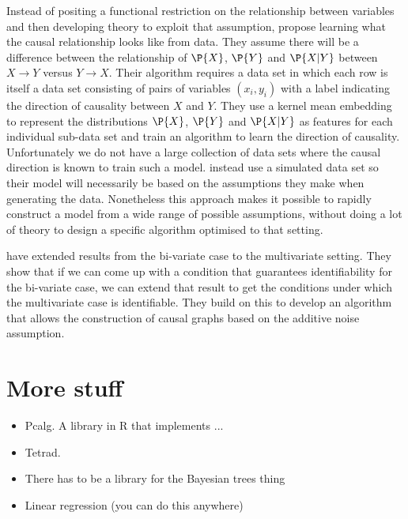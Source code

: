 Instead of positing a functional restriction on the relationship between variables and then developing theory to exploit that assumption, \citep{LopezPaz2014} propose learning what the causal relationship looks like from data. They assume there will be a difference between the relationship of $\P{X}$, $\P{Y}$ and $\P{X|Y}$ between $X \rightarrow Y$ versus $Y \rightarrow X$. Their algorithm requires a data set in which each row is itself a data set consisting of pairs of variables $(x_i,y_i)$ with a label indicating the direction of causality between $X$ and $Y$. They use a kernel mean embedding to represent the distributions $\P{X}$, $\P{Y}$ and $\P{X|Y}$ as features for each individual sub-data set and train an algorithm to learn the direction of causality. Unfortunately we do not have a large collection of data sets where the causal direction is known to train such a model. \citet{LopezPaz2014} instead use a simulated data set so their model will necessarily be based on the assumptions they make when generating the data. Nonetheless this approach makes it possible to rapidly construct a model from a wide range of possible assumptions, without doing a lot of theory to design a specific algorithm optimised to that setting. 

\citep{Peters2014} have extended results from the bi-variate case to the multivariate setting. They show that if we can come up with a condition that guarantees identifiability for the bi-variate case, we can extend that result to get the conditions under which the multivariate case is identifiable. They build on this to develop an algorithm that allows the construction of causal graphs based on the additive noise assumption. 

\chapter{More stuff}

\begin{itemize}
\item Pcalg. A library in R that implements ...
\item Tetrad.
\item There has to be a library for the Bayesian trees thing
\item Linear regression (you can do this anywhere)

\end{itemize}



